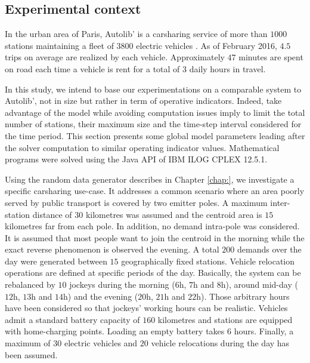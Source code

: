 \begin{bibunit}[ieeetr]
\section{Experimental context} \label{sec:energyExp:context}
In the urban area of Paris, Autolib' is a carsharing service of more than $1000$ stations maintaining a fleet of $3800$ electric vehicles \cite{autolib_chiffres_2016}.
As of February 2016, $4.5$ trips on average are realized by each vehicle.
Approximately $47$ minutes are spent on road each time a vehicle is rent for a total of $3$ daily hours in travel.

\medskip
In this study, we intend to base our experimentations on a comparable system to Autolib', not in size but rather in term of operative indicators.
Indeed, take advantage of the {\ENERGY} model while avoiding computation issues imply to limit the total number of stations, their maximum size and the time-step interval considered for the time period. %
This section presents some global model parameters leading after the solver computation to similar operating indicator values.
Mathematical programs were solved using the Java API of IBM ILOG CPLEX 12.5.1.

\medskip
Using the random data generator describes in Chapter \ref{chap:}, we investigate a specific carsharing use-case.
It addresses a common scenario where an area poorly served by public transport is covered by two emitter poles.
A maximum inter-station distance of $30$ kilometres was assumed and the centroid area is $15$ kilometres far from each pole.
In addition, no demand intra-pole was considered.
It is assumed that most people want to join the centroid in the morning while the exact reverse phenomenon is observed the evening.
A total $200$ demands over the day were generated between $15$ geographically fixed stations.
Vehicle relocation operations are defined at specific periods of the day.
Basically, the system can be rebalanced by $10$ jockeys during the morning ($6$h, $7$h and $8$h), around mid-day ($12$h, $13$h and $14$h) and the evening ($20$h, $21$h and $22$h).
Those arbitrary hours have been considered so that jockeys' working hours can be realistic.
Vehicles admit a standard battery capacity of $160$ kilometres and stations are equipped with home-charging points.
Loading an empty battery takes $6$ hours.
Finally, a maximum of $30$ electric vehicles and $20$ vehicle relocations during the day has been assumed.


\end{bibunit}
